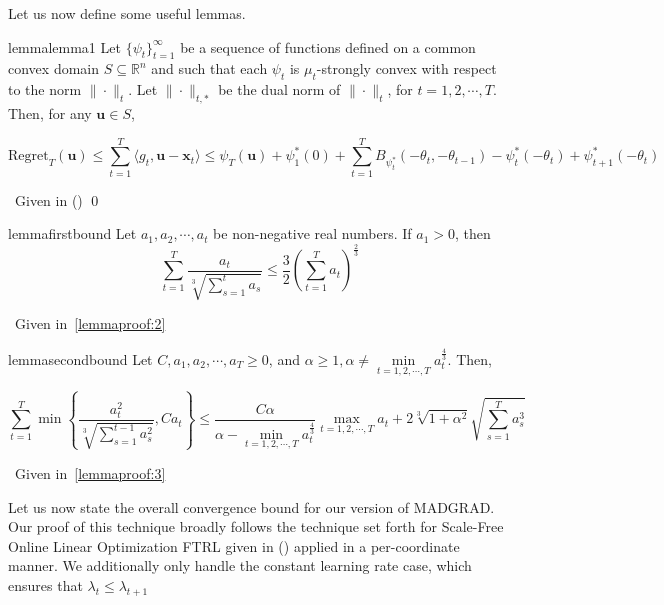 \documentclass{article}
\newcommand{\R}{\mathbb{R}}
\newcommand{\Regret}{\text{Regret}}
\newcommand{\bx}{\mathbf{x}}
\newcommand{\bu}{\mathbf{u}}
\begin{document}
Let us now define some useful lemmas.

\begin{restatable}{lemma}{lemma1}\label{lemma:1}
  Let $\{\psi_t\}_{t=1}^\infty$ be a sequence of functions defined on a common convex domain $S \subseteq \R^n$ and
  such that each $\psi_t$ is $\mu_t$-strongly convex with respect to the norm $\|\cdot\|_t$. Let $\|\cdot\|_{t, *}$ be
  the dual norm of $\| \cdot \|_t$, for $t = 1, 2, \cdots, T$. Then, for any $\bu \in S$,

  \[
    \Regret _T (\bu) \leq \sum\limits_{t=1}^T \langle g_t, \bu - \bx_t \rangle \leq \psi_{T}(\bu) + \psi_{1}^* (0) +
    \sum\limits_{t=1}^T B_{\psi_{t}^*}(-\theta_t, -\theta_{t-1}) - \psi_{t}^* (-\theta_t) +
    \psi_{t+1}^*(-\theta_t)
  \]
\end{restatable}

\proof~Given in (\cite{orabona_generalized_2014})
\qed

\begin{restatable}{lemma}{firstbound}\label{lemma:2}
  Let $a_1, a_2, \cdots, a_t$ be non-negative real numbers. If $a_1 > 0$, then
  \[
    \sum\limits_{t=1}^T \frac{a_t}{\sqrt[3]{\sum\limits_{s=1}^t a_s}} \leq \frac{3}{2}\left(\sum\limits_{t=1}^T
    a_t\right)^\frac{2}{3}
  \]
\end{restatable}

\proof~Given in~\ref{lemmaproof:2}

\begin{restatable}{lemma}{secondbound}\label{lemma:3}
  Let $C, a_1, a_2, \cdots, a_T \geq 0$, and $\alpha \geq 1, \alpha \neq \min\limits_{t=1,2,\cdots,T}a_{t}^\frac{4}{3}$.
  Then,

  \[
    \sum\limits_{t=1}^T \min \left\{ \frac{a_{t}^2}{\sqrt[3]{\sum\limits_{s=1}^{t-1} a_{s}^2}}, C a_t\right\} \leq
    \frac{C \alpha}{\alpha - \min\limits_{t=1,2,\cdots,T}a_{t}^\frac{4}{3}} \max\limits_{t=1,2,\cdots,T} a_t
    + 2\sqrt[3]{1 + \alpha^2} \sqrt{\sum\limits_{s=1}^T a_{s}^3}
  \]
\end{restatable}

\proof~Given in~\ref{lemmaproof:3}

Let us now state the overall convergence bound for our version of MADGRAD. Our proof of this technique broadly follows
the technique set forth for Scale-Free Online Linear Optimization FTRL given in (\cite{orabona_scale-free_2015}) applied
in a per-coordinate manner. We additionally only handle the constant learning rate case, which ensures that $\lambda_t
\leq \lambda_{t+1}$
\end{document}
